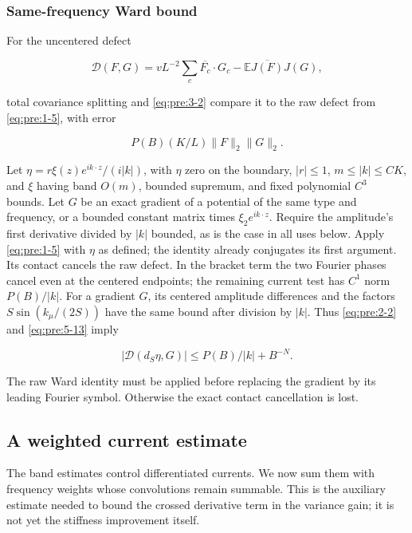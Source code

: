 \subsubsection{Same-frequency Ward bound}\label{pre:part-5-4}

For the uncentered defect

\[
\mathcal D(F,G)=vL^{-2}\sum_c\overline{F_c}\cdot G_c
-\mathbb E\overline{J(F)}J(G),
\]

total covariance splitting and \eqref{eq:pre:3-2} compare it to the raw defect from \eqref{eq:pre:1-5}, with error

\begin{equation}
P(B)(K/L)\|F\|_2\|G\|_2.
\label{eq:pre:5-13}
\end{equation}

Let \(\eta=r\xi(z)e^{ik\cdot z}/(i|k|)\), with \(\eta\) zero on the boundary, \(|r|\leq1\), \(m\leq|k|\leq CK\), and \(\xi\) having band \(O(m)\), bounded supremum, and fixed polynomial \(C^3\) bounds. Let \(G\) be an exact gradient of a potential of the same type and frequency, or a bounded constant matrix times \(\xi_2e^{ik\cdot z}\). Require the amplitude's first derivative divided by \(|k|\) bounded, as is the case in all uses below. Apply \eqref{eq:pre:1-5} with \(\eta\) as defined; the identity already conjugates its first argument. Its contact cancels the raw defect. In the bracket term the two Fourier phases cancel even at the centered endpoints; the remaining current test has \(C^1\) norm \(P(B)/|k|\). For a gradient \(G\), its centered amplitude differences and the factors \(S\sin(k_\mu/(2S))\) have the same bound after division by \(|k|\). Thus \eqref{eq:pre:2-2} and \eqref{eq:pre:5-13} imply

\begin{equation}
|\mathcal D(d_S\eta,G)|\leq P(B)/|k|+B^{-N}.
\label{eq:pre:5-14}
\end{equation}

The raw Ward identity must be applied before replacing the gradient by its leading Fourier symbol. Otherwise the exact contact cancellation is lost.


\subsection{A weighted current estimate}\label{pre:weighted}

The band estimates control differentiated currents. We now sum them with
frequency weights whose convolutions remain summable. This is the
auxiliary estimate needed to bound the crossed derivative term in the
variance gain; it is not yet the stiffness improvement itself.

